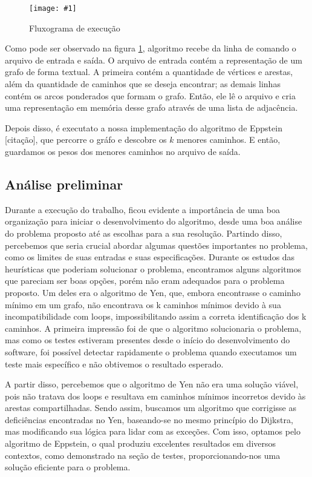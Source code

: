 \documentclass[12pt]{article}
\def\widthmod{}
\newcommand*\image[2]{\noindent \begin{figure}[htbp]
    \centering
    \texttt{[image: \#1]}
    \caption{#2}
    \label{fig: #1}
    \end{figure}
    }
\begin{document}
    \image{fluxo}{Fluxograma de execução}

    Como pode ser observado na figura \ref{fig: fluxo}, algoritmo recebe da linha de
    comando o arquivo de entrada e saída. O arquivo de entrada contém a
    representação de um grafo de forma textual. A primeira contém a quantidade
    de vértices e arestas, além da quantidade de caminhos que se deseja
    encontrar; as demais linhas contém os arcos ponderados que formam o grafo.
    Então, ele lê o arquivo e cria uma representação em memória desse grafo
    através de uma lista de adjacência.

    Depois disso, é executato a nossa implementação do algoritmo de Eppstein
    [citação], que percorre o gráfo e descobre os $k$ menores caminhos. E então,
    guardamos os pesos dos menores caminhos no arquivo de saída.

    \subsection{Análise preliminar}

    Durante a execução do trabalho, ficou evidente a importância de uma boa organização para iniciar o desenvolvimento do algoritmo, desde uma boa análise do problema proposto até as escolhas para a sua resolução. Partindo disso, percebemos que seria crucial abordar algumas questões importantes no problema, como os limites de suas entradas e suas especificações. Durante os estudos das heurísticas que poderiam solucionar o problema, encontramos alguns algoritmos que pareciam ser boas opções, porém não eram adequados para o problema proposto. Um deles era o algoritmo de Yen, que, embora encontrasse o caminho mínimo em um grafo, não encontrava os k caminhos mínimos devido à sua incompatibilidade com loops, impossibilitando assim a correta identificação dos k caminhos. A primeira impressão foi de que o algoritmo solucionaria o problema, mas como os testes estiveram presentes desde o início do desenvolvimento do software, foi possível detectar rapidamente o problema quando executamos um teste mais específico e não obtivemos o resultado esperado. 
    
    A partir disso, percebemos que o algoritmo de Yen não era uma solução viável, pois não tratava dos loops e resultava em caminhos mínimos incorretos devido às arestas compartilhadas. Sendo assim, buscamos um algoritmo que corrigisse as deficiências encontradas no Yen, baseando-se no mesmo princípio do Dijkstra, mas modificando sua lógica para lidar com as exceções. Com isso, optamos pelo algoritmo de Eppstein, o qual produziu excelentes resultados em diversos contextos, como demonstrado na seção de testes, proporcionando-nos uma solução eficiente para o problema.
\end{document}
